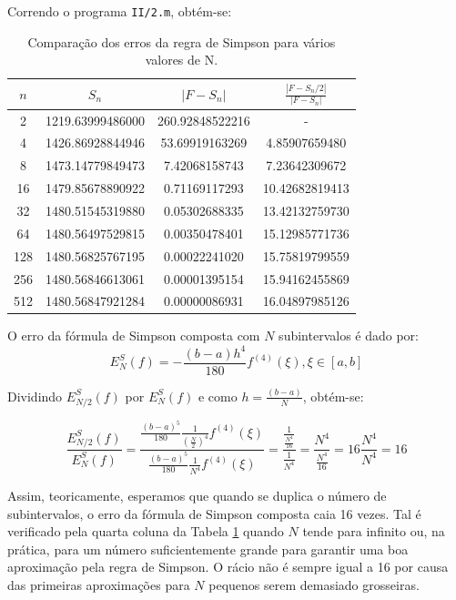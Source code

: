 \documentclass[portuguese, a4paper]{article}
\begin{document}
	\subsubsection{} \label{sec:II.2b)}
	\par
	Correndo o programa \texttt{II/2.m}, obtém-se:
	\begin{table}[H]
		\centering
		\begin{tabular}{|c|c|c|c|}
			\hline
			$n$	& $S_n$				& $|F - S_n|$		& $\frac{|F - S_n/2|}{|F - S_n|}$ \\ \hline
			2	& 1219.63999486000	& 260.92848522216	& -					\\ \hline
			4	& 1426.86928844946	& 53.69919163269	& 4.85907659480		\\ \hline
			8	& 1473.14779849473	& 7.42068158743		& 7.23642309672		\\ \hline
			16	& 1479.85678890922	& 0.71169117293		& 10.42682819413	\\ \hline
			32	& 1480.51545319880	& 0.05302688335		& 13.42132759730	\\ \hline
			64	& 1480.56497529815	& 0.00350478401		& 15.12985771736	\\ \hline
			128	& 1480.56825767195	& 0.00022241020		& 15.75819799559	\\ \hline
			256	& 1480.56846613061	& 0.00001395154		& 15.94162455869	\\ \hline
			512	& 1480.56847921284	& 0.00000086931		& 16.04897985126	\\ \hline
		\end{tabular}
		\caption{Comparação dos erros da regra de Simpson para vários valores de N.}
		\label{tab:simp}
	\end{table}
	\par
	O erro da fórmula de Simpson composta com $N$ subintervalos é dado por:
	$$E_N^S(f) = -\frac{(b - a)h^4}{180}f^{(4)}(\xi), \xi \in [a,b]$$

	\par
	Dividindo $E_{N/2}^S(f)$ por $E_N^S(f)$ e como $h = \frac{(b - a)}{N}$, obtém-se:

	$$\frac{E_{N/2}^S(f)}{E_N^S(f)} =
	\frac{\frac{(b - a)^5}{180}\frac{1}{(\frac{N}{2})^4}f^{(4)}(\xi)}
		 {\frac{(b - a)^5}{180}\frac{1}{N^4}f^{(4)}(\xi)} =
	\frac{\frac{1}{\frac{N^4}{16}}}{\frac{1}{N^4}} = \frac{N^4}{\frac{N^4}{16}} =
	16\frac{N^4}{N^4} = 16$$

	\par
	Assim, teoricamente, esperamos que quando se duplica o número de subintervalos, o erro da fórmula de Simpson composta caia 16 vezes. Tal é verificado pela quarta coluna da Tabela \ref{tab:simp} quando $N$ tende para infinito ou, na prática, para um número suficientemente grande para garantir uma boa aproximação pela regra de Simpson. O rácio não é sempre igual a 16 por causa das primeiras aproximações para $N$ pequenos serem demasiado grosseiras.
\end{document}
